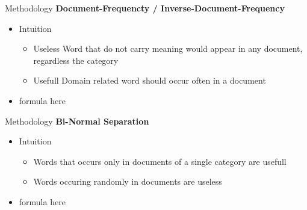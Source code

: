 \begin{frame}[label=metho]{Methodology}
	\textbf{Document-Frequencty / Inverse-Document-Frequency}
	\begin{itemize}
		\item Intuition
		\begin{itemize}
			\item Useless Word that do not carry meaning would appear in any document, regardless the category
			\item Usefull Domain related word should occur often in a document
		\end{itemize}
		\item formula here
	\end{itemize}
\end{frame}


\begin{frame}[label=metho]{Methodology}
	\textbf{Bi-Normal Separation}
	\begin{itemize}
		\item Intuition
		\begin{itemize}
			\item Words that occurs only in documents of a single category are usefull
			\item Words occuring randomly in documents are useless
		\end{itemize}
			\item formula here
	\end{itemize}
\end{frame}


